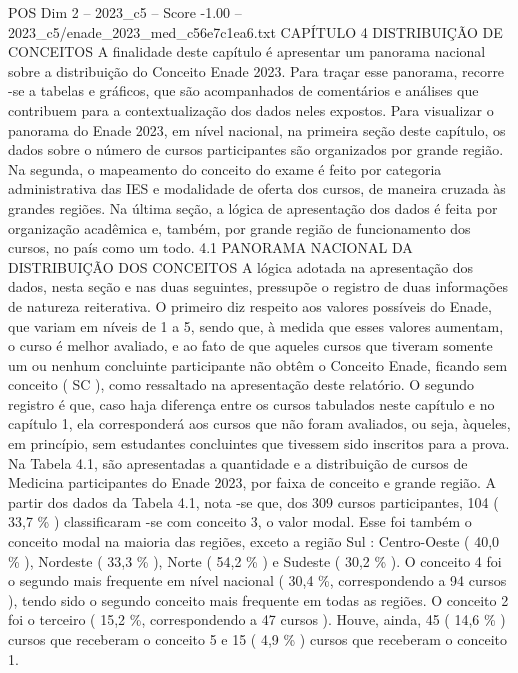 \begin{textsample}{POS Dim 2 – 2023\_c5 – Score -1.00 – 2023\_c5/enade\_2023\_med\_c56e7c1ea6.txt}  \label{ex:f2_pos_262}
CAPÍTULO 4 DISTRIBUIÇÃO DE CONCEITOS A finalidade deste capítulo é apresentar um panorama nacional sobre a distribuição do Conceito Enade 2023.
Para traçar esse panorama, recorre -se a tabelas e gráficos, que são acompanhados de comentários e análises que contribuem para a contextualização dos dados neles expostos.
Para visualizar o panorama do Enade 2023, em nível nacional, na primeira seção deste capítulo, os dados sobre o número de cursos participantes são organizados por grande região.
Na segunda, o mapeamento do conceito do exame é feito por categoria administrativa das IES e modalidade de oferta dos cursos, de maneira cruzada às grandes regiões.
Na última seção, a lógica de apresentação dos dados é feita por organização acadêmica e, também, por grande região de funcionamento dos cursos, no país como um todo. 4.1 PANORAMA NACIONAL DA DISTRIBUIÇÃO DOS CONCEITOS A lógica adotada na apresentação dos dados, nesta seção e nas duas seguintes, pressupõe o registro de duas informações de natureza reiterativa.
O primeiro diz respeito aos valores possíveis do Enade, que variam em níveis de 1 a 5, sendo que, à medida que esses valores aumentam, o curso é melhor avaliado, e ao fato de que aqueles cursos que tiveram somente um ou nenhum concluinte participante não obtêm o Conceito Enade, ficando sem conceito ( SC ), como ressaltado na apresentação deste relatório.
O segundo registro é que, caso haja diferença entre os cursos tabulados neste capítulo e no capítulo 1, ela corresponderá aos cursos que não foram avaliados, ou seja, àqueles, em princípio, sem estudantes concluintes que tivessem sido inscritos para a prova.
Na Tabela 4.1, são apresentadas a quantidade e a distribuição de cursos de Medicina participantes do Enade 2023, por faixa de conceito e grande região.
A partir dos dados da Tabela 4.1, nota -se que, dos 309 cursos participantes, 104 ( 33,7 \% ) classificaram -se com conceito 3, o valor modal.
Esse foi também o conceito modal na maioria das regiões, exceto a região Sul : Centro-Oeste ( 40,0 \% ), Nordeste ( 33,3 \% ), Norte ( 54,2 \% ) e Sudeste ( 30,2 \% ).
O conceito 4 foi o segundo mais frequente em nível nacional ( 30,4 \%, correspondendo a 94 cursos ), tendo sido o segundo conceito mais frequente em todas as regiões.
O conceito 2 foi o terceiro ( 15,2 \%, correspondendo a 47 cursos ).
Houve, ainda, 45 ( 14,6 \% ) cursos que receberam o conceito 5 e 15 ( 4,9 \% ) cursos que receberam o conceito 1.

\end{textsample}
